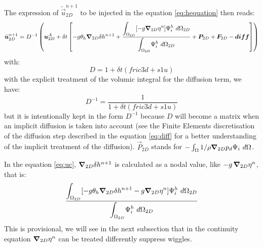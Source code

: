 The expression of $\tilde{\vec{u}}_{2D}^{n+1}$ to be injected in the equation
\eqref{eq:hequation} then reads:
\begin{equation}
\tilde{\bm{u}}_{2D}^{n+1}=D^{-1}\left(\bm{u}_{2D}^{A}+\delta t\left[-g\theta_{h}\bm{\nabla}_{2D}
\delta h^{n+1}+\dfrac{\displaystyle{\int_{\Omega_{2D}}}[-g\bm{\nabla}_{2D}\eta^{n}]
\Psi_{i}^{h}~d\Omega_{2D}}{\displaystyle{\int_{\Omega_{2D}}}\Psi_{i}^{h}~d\Omega_{2D}}
+\bm{P}_{2D}+\bm{F}_{2D}-\bm{diff}\right]\right)\label{eq:uc}
\end{equation}
with:
\begin{equation}
D=1+\delta t(fric3d+s1u)
\end{equation}
with the explicit treatment of the volumic integral for the diffusion term, we have:
\begin{equation}
D^{-1}=\dfrac{1}{1+\delta t(fric3d+s1u)}%
\end{equation}
but it is intentionally kept in the form $D^{-1}$ because $D$ will become a
matrix when an implicit diffusion is taken into account (see the Finite Elements
discretisation of the diffusion step described in the equation \eqref{eq:diff}
for a better understanding of the implicit treatment of the diffusion).
$\vec{P}_{2D}$ stands for $-\int_{\Omega}1/\rho\bm{\nabla}_{2D} p_{d}\Psi_{i}~d\Omega$.

In the equation \eqref{eq:uc}, $\bm{\nabla}_{2D}\delta h^{n+1}$ is calculated as
a nodal value, like $-g\,\bm{\nabla}_{2D}\eta^{n}$, that is:%
\begin{equation}
\dfrac{\displaystyle{\int_{\Omega_{2D}}}[-g\theta_{h}\bm{\nabla}_{2D}\delta
h^{n+1}-g\bm{\nabla}_{2D}\eta^{n}]\Psi_{i}^{h}~d\Omega_{2D}}
{\displaystyle{\int_{\Omega_{2D}}}\Psi_{i}^{h}~d\Omega_{2D}}
\end{equation}
This is provisional, we will see in the next subsection that in the continuity
equation $\bm{\nabla}_{2D}\eta^{n}$ can be treated differently suppress wiggles.

